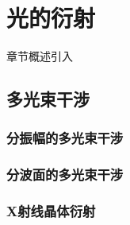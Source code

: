 \chapter{光的衍射}\label{26}

章节概述引入

\section{多光束干涉}\label{26-1}

\subsection{分振幅的多光束干涉}\label{26-1-1}

\subsection{分波面的多光束干涉}\label{26-1-2}

\subsection{X射线晶体衍射}\label{26-1-3}

